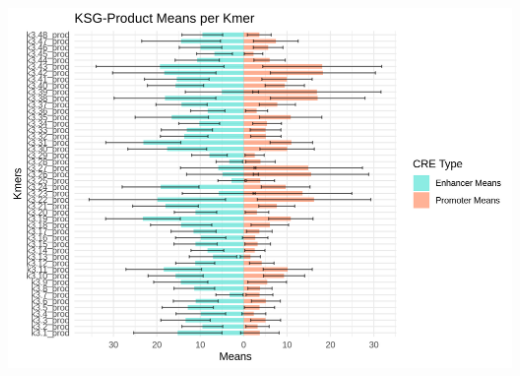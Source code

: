 \documentclass[
  letterpaper,
  DIV=11,
  numbers=noendperiod]{scrartcl}
\begin{document}
\begin{center}
\includegraphics[width=\textwidth,height=1\textheight]{gb-test-pdf_files/figure-pdf/unnamed-chunk-23-1.png}
\end{center}
\end{document}
